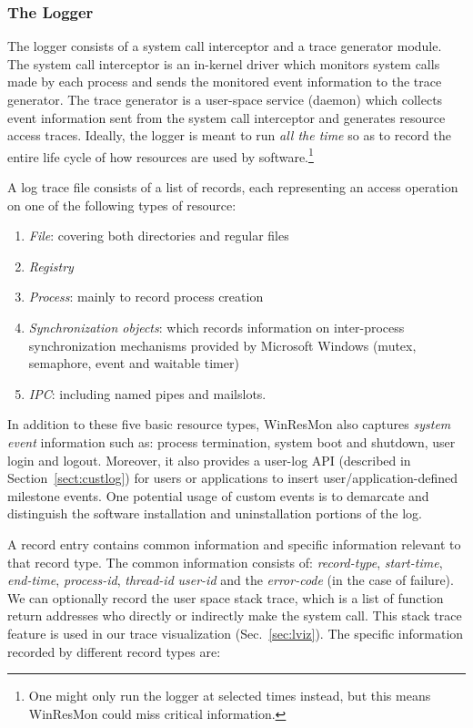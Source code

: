 \subsubsection{The Logger}

The logger consists of a system call interceptor and a trace
generator module.  The system call interceptor is an in-kernel driver which
monitors system calls made by each process and sends the monitored event
information to the trace generator.  The trace generator is a user-space
service (daemon) which collects event information sent from the system call
interceptor and generates resource access traces.  Ideally, the logger is
meant to run {\em all the time} so as to record the entire life cycle of how
resources are used by software.\footnote{ One might only run the
logger at selected times instead, but this means WinResMon could miss critical information.}

A log trace file consists of a list of records, each representing 
an access operation on one of the following types of resource:

\begin{enumerate}
\item {\em File}: covering both directories and regular files
\item {\em Registry}
\item {\em Process}: mainly to record process creation
\item {\em Synchronization objects}: which records information on
inter-process synchronization mechanisms provided by Microsoft Windows (mutex,
semaphore, event and waitable timer)
\item {\em IPC}: including named pipes and mailslots.
\end{enumerate}

In addition to these five basic resource types, WinResMon also captures {\it
system event} information such as: process termination, system boot and
shutdown, user login and logout.  
Moreover, it also provides a user-log API
(described in Section~\ref{sect:custlog}) for users or applications to insert
user/application-defined milestone events.  One potential usage of custom
events is to demarcate and distinguish the software installation and
uninstallation portions of the log.

A record entry contains common information and specific information
relevant to that record type.
The common information consists of: {\em record-type}, 
{\em start-time}, {\em end-time}, {\em process-id}, {\em thread-id}
{\em user-id} and the {\em error-code} 
(in the case of failure).  
We can optionally record the user space stack trace, which is a list
of function return addresses who directly or indirectly make the
system call.
This stack trace feature is used in our trace visualization (Sec.~\ref{sec:lviz}).
The specific information recorded by different record types are:

